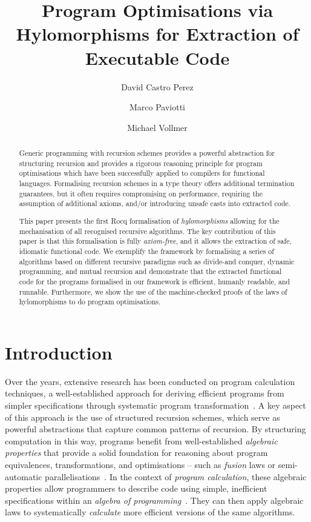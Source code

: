 \documentclass[a4paper,UKenglish,cleveref, autoref, thm-restate]{lipics-v2021}
\title{Program Optimisations via Hylomorphisms for Extraction of Executable Code}
\author{David {Castro Perez}}%
{University Of Kent, Canterbury, CT2 7NZ, United Kingdom}%
{D.Castro-Perez@kent.ac.uk}%
{0000-0002-6939-4189}%
{EP/Y00339X/1, EP/T014512/1}
\author{Marco Paviotti}%
{University Of Kent, Canterbury, CT2 7NZ, United Kingdom}%
{M.Paviotti@kent.ac.uk}%
{0000-0002-1513-0807}%
{}
\author{Michael Vollmer}%
{University Of Kent, Canterbury, CT2 7NZ, United Kingdom}%
{M.Vollmer@kent.ac.uk}%
{0000-0002-0496-8268}%
{}
\begin{document}
\maketitle

\begin{abstract}
  Generic programming with recursion schemes provides a powerful abstraction for
  structuring recursion and provides a rigorous reasoning principle for program
  optimisations which have been successfully applied to compilers for functional
  languages. Formalising recursion schemes in a type theory offers additional
  termination guarantees, but it often requires compromising on performance,
  requiring the assumption of additional axioms, and/or introducing unsafe casts
  into extracted code.

  This paper presents the first Rocq formalisation of \emph{hylomorphisms}
  allowing for the mechanisation of all recognised recursive algorithms. The key
  contribution of this paper is that this formalisation is fully
  \emph{axiom-free}, and it allows the extraction of safe, idiomatic functional
  code. We exemplify the framework by formalising a series of algorithms based
  on different recursive paradigms such as divide-and conquer, dynamic
  programming, and mutual recursion and demonstrate that the extracted
  functional code for the programs formalised in our framework is efficient,
  humanly readable, and runnable. Furthermore, we show the use of the
  machine-checked proofs of the laws of hylomorphisms to do program
  optimisations.
\end{abstract}

\section{Introduction}
\label{sec:intro}
Over the years, extensive research has been conducted on program calculation
techniques, a well-established approach for deriving efficient programs from
simpler specifications through systematic program
transformation~\cite{gibbonsSquiggol, BirddeMoor96:Algebra}. A key aspect of
this approach is the use of structured recursion schemes, which serve as
powerful abstractions that capture common patterns of recursion. By structuring
computation in this way, programs benefit from well-established \emph{algebraic
properties} that provide a solid foundation for reasoning about program
equivalences, transformations, and optimisations -- such as \emph{fusion} laws or
semi-automatic parallelisations~\cite{TakanoM95,Gibbons96:Third,Morihata09:Third,farmsCastro}.
In the context of \emph{program calculation}, these algebraic properties allow
programmers to describe code using simple, inefficient specifications within an
\emph{algebra of programming}~\cite{BirddeMoor96:Algebra}. They can then apply
algebraic laws to systematically \emph{calculate} more efficient versions of the
same algorithms.
\end{document}
